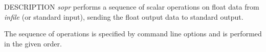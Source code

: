 \begin{synopsis}
\item[sopr] [ --a $A$ ] [ --s $S$ ] [ --m $M$ ] [ --d $D$ ] [ --p $P$ ] [ --f $F$ ]
  [ --c $C$ ] [ --magic $magic$ ]
\item[\ ~~~~~] [ --MAGIC $MAGIC$ ] [ --ABS ] [ --INV ] [ --P ] [ --R ] [ --SQRT ] [ --LN ]
\item[\ ~~~~~] [ --LOG2 ] [ --LOG10 ] [ --LOGX $X$ ] [ --EXP ] [ --POW2 ] [ --POW10 ]
\item[\ ~~~~~] [ --POWX $X$ ] [ --FIX ] [ --UNIT ] [ --CLIP ] [ --SIN ] [ --COS ] [ --TAN ]
\item[\ ~~~~~] [ --ATAN ] [ --r m$n$ ] [ --w m$n$ ] [ {\em infile} ]
\end{synopsis}

\begin{qsection}{DESCRIPTION}
{\em sopr} performs a sequence of scalar operations on float data 
from {\em infile} (or standard input), 
sending the float output data to standard output.

The sequence of operations is specified by command line options
and is performed in the given order.
\end{qsection}

